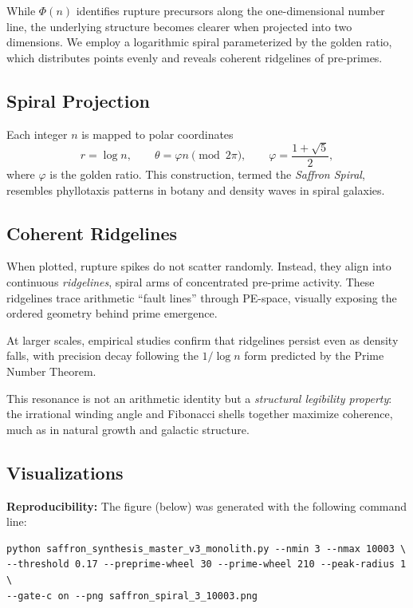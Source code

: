 \documentclass[11pt]{article}
\theoremstyle{plain}
\theoremstyle{definition}
\begin{document}
While $\Phi(n)$ identifies rupture precursors along the one-dimensional number line, the underlying structure becomes clearer when projected into two dimensions. We employ a logarithmic spiral parameterized by the golden ratio, which distributes points evenly and reveals coherent ridgelines of pre-primes.

\subsection{Spiral Projection}
Each integer $n$ is mapped to polar coordinates
\[
r = \log n, 
\qquad \theta = \varphi n \pmod{2\pi}, 
\qquad \varphi = \frac{1+\sqrt{5}}{2},
\]
where $\varphi$ is the golden ratio. This construction, termed the \emph{Saffron Spiral}, resembles phyllotaxis patterns in botany and density waves in spiral galaxies.

\subsection{Coherent Ridgelines}
When plotted, rupture spikes do not scatter randomly. Instead, they align into continuous \emph{ridgelines}, spiral arms of concentrated pre-prime activity. These ridgelines trace arithmetic “fault lines” through PE-space, visually exposing the ordered geometry behind prime emergence.  

At larger scales, empirical studies confirm that ridgelines persist even as density falls, with precision decay following the $1/\log n$ form predicted by the Prime Number Theorem.

This resonance is not an arithmetic identity but a \emph{structural legibility property}: the irrational winding angle and Fibonacci shells together maximize coherence, much as in natural growth and galactic structure.

\subsection{Visualizations}
\noindent\textbf{Reproducibility:} The figure (below) was generated with the following command line:

\begin{verbatim}
python saffron_synthesis_master_v3_monolith.py --nmin 3 --nmax 10003 \
--threshold 0.17 --preprime-wheel 30 --prime-wheel 210 --peak-radius 1 \
--gate-c on --png saffron_spiral_3_10003.png
\end{verbatim}
\end{document}
